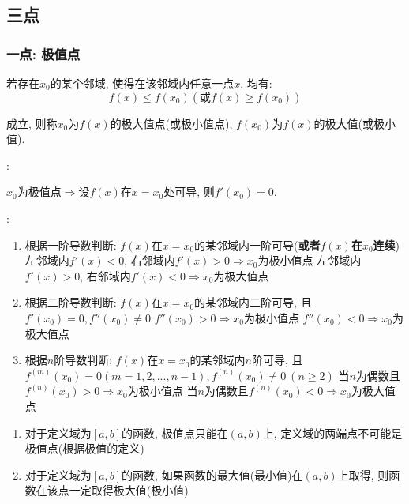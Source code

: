 \subsection{三点}
\subsubsection{一点: 极值点}
若存在$ x_{0} $的某个邻域, 使得在该邻域内任意一点$ x $, 均有:
\begin{equation*}
f(x)\le f(x_{0})(\text{或}f(x)\ge f(x_{0}))
\end{equation*}\par
成立, 则称$ x_{0} $为$ f(x) $的极大值点(或极小值点), $ f(x_{0}) $为$ f(x) $的极大值(或极小值).\par \vspace{.5em}
:\par \vspace{.5em}
$ x_{0} $为极值点$ \Rightarrow $设$ f(x) $在$ x=x_{0} $处可导, 则$ f'(x_{0})=0 $.\par \vspace{.5em}
:
\begin{enumerate}
\item 根据一阶导数判断: $ f(x) $在$ x=x_{0} $的某邻域内一阶可导(\textbf{或者$ f(x) $在$ x_{0} $连续})
\subitem 左邻域内$ f'(x)<0 $, 右邻域内$ f'(x)>0\Rightarrow x_{0} $为极小值点
\subitem 左邻域内$ f'(x)>0 $, 右邻域内$ f'(x)<0\Rightarrow x_{0} $为极大值点
\item 根据二阶导数判断: $ f(x) $在$ x=x_{0} $的某邻域内二阶可导, 且$ f'(x_{0})=0, f''(x_{0})\neq 0 $
\subitem $ f''(x_{0})>0\Rightarrow x_{0} $为极小值点
\subitem $ f''(x_{0})<0\Rightarrow x_{0} $为极大值点
\item 根据$ n $阶导数判断: $ f(x) $在$ x=x_{0} $的某邻域内$ n $阶可导, 且$ f^{(m)}(x_{0})=0(m=1,2,...,n-1), f^{(n)}(x_{0})\neq 0\ (n\ge 2) $
\subitem 当$ n $为偶数且$ f^{(n)}(x_{0})>0\Rightarrow x_{0} $为极小值点
\subitem 当$ n $为偶数且$ f^{(n)}(x_{0})<0\Rightarrow x_{0} $为极大值点
\end{enumerate}
\begin{tcolorbox}
\begin{enumerate}
\item 对于定义域为$ [a,b] $的函数, 极值点只能在$ (a,b) $上, 定义域的两端点不可能是极值点(根据极值的定义)
\item 对于定义域为$ [a,b] $的函数, 如果函数的最大值(最小值)在$ (a,b) $上取得, 则函数在该点一定取得极大值(极小值)
\end{enumerate}
\end{tcolorbox}
